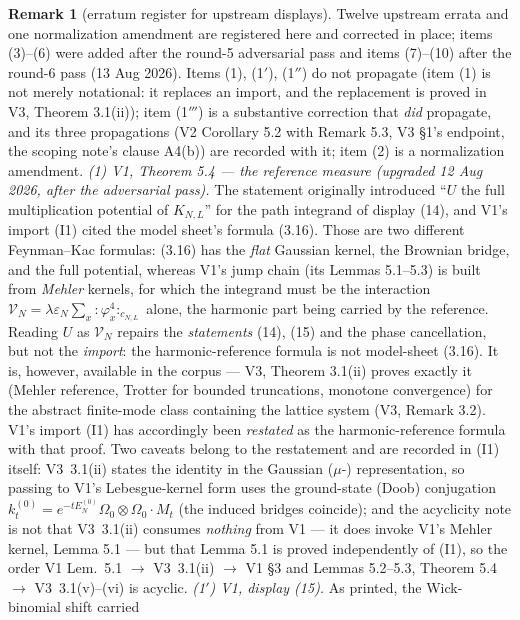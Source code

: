 \documentclass[11pt,a4paper]{article}
\theoremstyle{plain}
\theoremstyle{definition}
\newtheorem{remark}[theorem]{Remark}
\newcommand{\eps}{\varepsilon}
\begin{document}
\begin{remark}[erratum register for upstream displays]\label{rem:erratum}
Twelve upstream errata and one normalization amendment are registered here and
corrected in place; items (3)--(6) were added after the round-5 adversarial pass and
items (7)--(10) after the round-6 pass (13 Aug 2026). Items (1), (1$'$), (1$''$) do not propagate (item (1) is not merely
notational: it replaces an import, and the replacement is proved in V3,
Theorem 3.1(ii)); item (1$'''$) is a substantive correction
that \emph{did} propagate, and its three propagations (V2 Corollary 5.2 with
Remark 5.3, V3 \S1's endpoint, the scoping note's clause A4(b)) are recorded
with it; item (2) is a normalization amendment.
\emph{(1) V1, Theorem 5.4 --- the reference measure (upgraded 12 Aug 2026,
after the adversarial pass).} The statement originally introduced ``$U$ the
full multiplication potential of $K_{N,L}$'' for the path integrand of
display (14), and V1's import (I1) cited the model sheet's formula (3.16).
Those are two different Feynman--Kac formulas: (3.16) has the \emph{flat}
Gaussian kernel, the Brownian bridge, and the full potential, whereas V1's
jump chain (its Lemmas 5.1--5.3) is built from \emph{Mehler} kernels, for
which the integrand must be the interaction
$\mathcal V_N=\lambda\eps_N\sum_x{:}\varphi_x^4{:}_{c_{N,L}}$ alone, the
harmonic part being carried by the reference. Reading $U$ as
$\mathcal V_N$ repairs the \emph{statements} (14), (15) and the phase
cancellation, but not the \emph{import}: the harmonic-reference formula is
not model-sheet (3.16). It is, however, available in the corpus --- V3,
Theorem 3.1(ii) proves exactly it (Mehler reference, Trotter for bounded
truncations, monotone convergence) for the abstract finite-mode class
containing the lattice system (V3, Remark 3.2). V1's import (I1) has
accordingly been \emph{restated} as the harmonic-reference formula with that
proof. Two caveats belong to the restatement and are recorded in (I1)
itself: V3~3.1(ii) states the identity in the Gaussian ($\mu$-)
representation, so passing to V1's Lebesgue-kernel form uses the
ground-state (Doob) conjugation
$k^{(0)}_t=e^{-tE^{(0)}_N}\Omega_0\otimes\Omega_0\cdot M_t$ (the induced
bridges coincide); and the acyclicity note is not that V3~3.1(ii) consumes
\emph{nothing} from V1 --- it does invoke V1's Mehler kernel, Lemma 5.1 ---
but that Lemma 5.1 is proved independently of (I1), so the order
V1 Lem.\ 5.1 $\to$ V3~3.1(ii) $\to$ V1 \S3 and Lemmas 5.2--5.3,
Theorem 5.4 $\to$ V3~3.1(v)--(vi) is acyclic.
\emph{(1$'$) V1, display (15).} As printed, the Wick-binomial shift carried

\end{remark}
\end{document}
